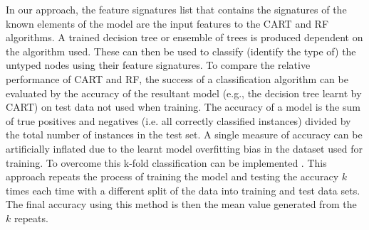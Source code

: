 In our approach, the feature signatures list that contains the signatures of the known elements of the model are the input features to the CART and RF algorithms. A trained decision tree or ensemble of trees is produced dependent on the algorithm used. These can then be used to classify (identify the type of) the untyped nodes using their feature signatures. To compare the relative performance of CART and RF, the success of a classification algorithm can be evaluated by the accuracy of the resultant model (e.g., the decision tree learnt by CART) on test data not used when training. The accuracy of a model is the sum of true positives and negatives (i.e. all correctly classified instances) divided by the total number of instances in the test set. A single measure of accuracy can be artificially inflated due to the learnt model overfitting bias in the dataset used for training. To overcome this k-fold classification can be implemented \cite{mitchell1997machine}. This approach repeats the process of training the model and testing the accuracy $k$ times each time with a different split of the data into training and test data sets. The final accuracy using this method is then the mean value generated from the $k$ repeats. 

